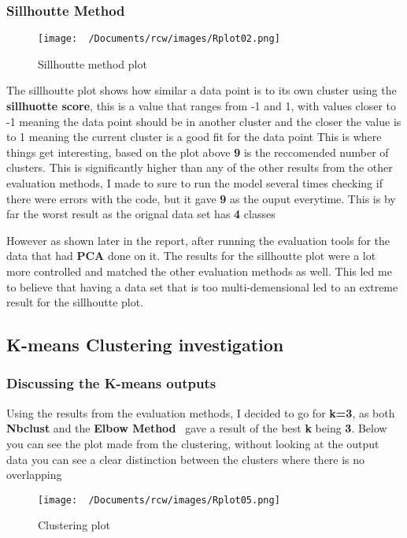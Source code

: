 \documentclass[11pt]{article}
\begin{document}
\subsubsection{Sillhoutte  Method}
\begin{figure}[H]
  \centering
  \texttt{[image: ~/Documents/rcw/images/Rplot02.png]}
  \caption{Sillhoutte method plot}
\end{figure}

The sillhoutte plot shows how similar a data point is to its own cluster using the \textbf{sillhuotte score}, this is a value 
that ranges from -1 and 1, with values closer to -1 meaning the data point should be in another cluster and the closer the value is to 1 meaning the current cluster is a good fit for the data point
This is where things get interesting, based on the plot above \textbf{9} is the reccomended number of clusters. This is significantly higher
than any of the other results from the other evaluation methods,
I made to sure to run the model several times checking if there were errors with the code, but it gave \textbf{9} as the ouput everytime. This is by far the worst result as the orignal data set has \textbf{4} classes

However as shown later in the report, after running the evaluation tools for the data that had \textbf{PCA} done on it. The results for the sillhoutte plot were 
a lot more controlled and matched the other evaluation methods as well. This led me to believe that having a data set that is too multi-demensional led to an extreme result for the sillhoutte plot.

\newpage
\subsection{K-means Clustering investigation}
\subsubsection{Discussing the K-means outputs}
Using the results from the evaluation methods, I decided to go for \textbf{k=3}, as both \textbf{Nbclust} and the \textbf{Elbow Method} \
gave a result of the best \textbf{k} being \textbf{3}.
Below you can see the plot made from the clustering, without looking at the output data you can see a clear distinction between the clusters where there is 
no overlapping

\begin{figure}[H]
  \centering
  \texttt{[image: ~/Documents/rcw/images/Rplot05.png]}
  \caption{Clustering plot}
\end{figure}
\end{document}
